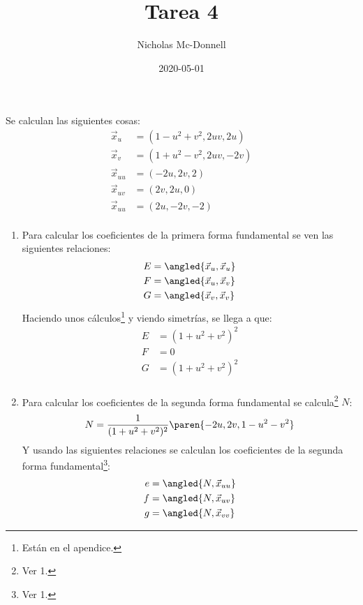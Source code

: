 \documentclass{homework}
\title{Tarea 4}
\date{2020-05-01}
\author{Nicholas Mc-Donnell}
\begin{document}
\maketitle
\newpage
{}

\begin{sol}[1]
    Se calculan las siguientes cosas:
    \begin{align*}
        \vec{x}_u&=(1-u^2+v^2,2uv,2u)\\
        \vec{x}_v&=(1+u^2-v^2,2uv,-2v)\\
        \vec{x}_{uu}&=(-2u,2v,2)\\
        \vec{x}_{uv}&=(2v,2u,0)\\
        \vec{x}_{uu}&=(2u,-2v,-2)\\
    \end{align*}
    \begin{enumerate}
        \item Para calcular los coeficientes de la primera forma fundamental se ven las siguientes relaciones:
        \begin{align*}
            E&=\angled{\vec{x}_u,\vec{x}_u}\\
            F&=\angled{\vec{x}_u,\vec{x}_v}\\
            G&=\angled{\vec{x}_v,\vec{x}_v}
        \end{align*}
        Haciendo unos cálculos\footnote{Están en el apendice.} y viendo simetrías, se llega a que:
        \begin{align*}
            E&=(1+u^2+v^2)^2\\
            F&=0\\
            G&=(1+u^2+v^2)^2\\
        \end{align*}
        \item Para calcular los coeficientes de la segunda forma fundamental se calcula\footnote{Ver 1.} \(N\):
        \begin{equation}
            N=\frac1{(1+u^2+v^2)^2}\paren{-2u,2v,1-u^2-v^2}
        \end{equation}
        Y usando las siguientes relaciones se calculan los coeficientes de la segunda forma fundamental\footnote{Ver 1.}:
        \begin{align*}
            e&=\angled{N,\vec{x}_{uu}}\\
            f&=\angled{N,\vec{x}_{uv}}\\
            g&=\angled{N,\vec{x}_{vv}}\\
        \end{align*}

\end{enumerate}
\end{sol}
\end{document}
